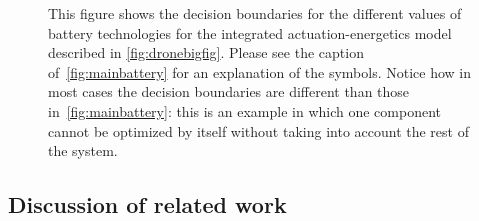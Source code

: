 \begin{figure}
\begin{centering}
{\begin{centering}
\par\end{centering}
}
\par\end{centering}
\begin{centering}
\par\end{centering}
\caption{\label{fig:drone_choice}This figure shows the decision boundaries
for the different values of battery technologies for the integrated
actuation-energetics model described in \cref{fig:dronebigfig}. Please
see the caption of~\cref{fig:mainbattery} for an explanation of the
symbols. Notice how in most cases the decision boundaries are different
than those in~\cref{fig:mainbattery}: this is an example in which
one component cannot be optimized by itself without taking into account
the rest of the system.}
\end{figure}




\subsection{Discussion of related work\label{sec:Discussion-of-related}}


